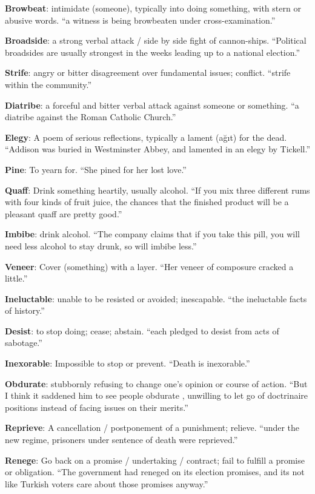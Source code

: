 \documentclass[12pt, a4paper]{ximera}
\begin{document}
\textbf{Browbeat}: intimidate (someone), typically into doing something, with stern or abusive words. ``a witness is being browbeaten under cross-examination.''

\textbf{Broadside}: a strong verbal attack / side by side fight of cannon-ships. ``Political broadsides are usually strongest in the weeks leading up to a national election.''

\textbf{Strife}: angry or bitter disagreement over fundamental issues; conflict. ``strife within the community.''

\textbf{Diatribe}: a forceful and bitter verbal attack against someone or something. ``a diatribe against the Roman Catholic Church.''

\textbf{Elegy}: A poem of serious reflections, typically a lament (a\u{g}{\i}t) for the dead. ``Addison was buried in Westminster Abbey, and lamented in an elegy by Tickell.''

\textbf{Pine}: To yearn for. ``She pined for her lost love.''

\textbf{Quaff}: Drink something heartily, usually alcohol. ``If you mix three different rums with four kinds of fruit juice, the chances that the finished product will be a pleasant quaff are pretty good.''

\textbf{Imbibe}: drink alcohol. ``The company claims that if you take this pill, you will need less alcohol to stay drunk, so will imbibe less.''

\textbf{Veneer}: Cover (something) with a layer. ``Her veneer of composure cracked a little.''

\textbf{Ineluctable}: unable to be resisted or avoided; inescapable. ``the ineluctable facts of history.''

\textbf{Desist}: to stop doing; cease; abstain. ``each pledged to desist from acts of sabotage.''

\textbf{Inexorable}: Impossible to stop or prevent. ``Death is inexorable.''

\textbf{Obdurate}: stubbornly refusing to change one's opinion or course of action. ``But I think it saddened him to see people obdurate , unwilling to let go of doctrinaire positions instead of facing issues on their merits.''

\textbf{Reprieve}: A cancellation / postponement of a punishment; relieve. ``under the new regime, prisoners under sentence of death were reprieved.''

\textbf{Renege}: Go back on a promise / undertaking / contract;  fail to fulfill a promise or obligation. ``The government had reneged on its election promises, and its not like Turkish voters care about those promises anyway.''
\end{document}
